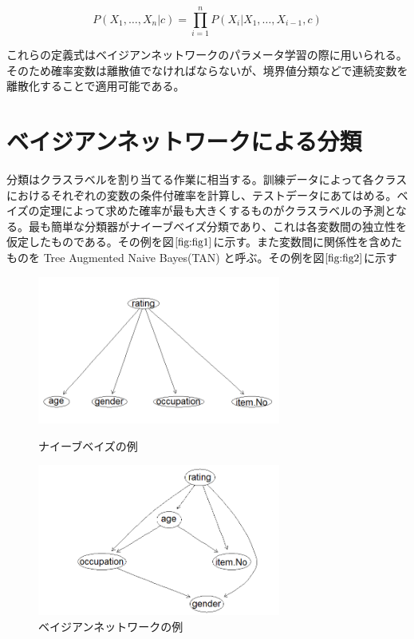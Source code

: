 \documentclass[a4j,12pt]{jarticle}
\begin{document}
\begin{equation}
\label{eq:eq2}
P(X_1, \ldots, X_n|c) = \prod_{i=1}^n P(X_i|X_1, \ldots, X_{i-1},c)
\end{equation}

これらの定義式はベイジアンネットワークのパラメータ学習の際に用いられる。そのため確率変数は離散値でなければならないが、境界値分類などで連続変数を離散化することで適用可能である。

\section{ベイジアンネットワークによる分類}

分類はクラスラベルを割り当てる作業に相当する。訓練データによって各クラスにおけるそれぞれの変数の条件付確率を計算し、テストデータにあてはめる。ベイズの定理によって求めた確率が最も大きくするものがクラスラベルの予測となる。最も簡単な分類器がナイーブベイズ分類であり、これは各変数間の独立性を仮定したものである。その例を図$\ref{fig:fig1}$に示す。また変数間に関係性を含めたものを Tree Augmented Naive Bayes(TAN) と呼ぶ。その例を図$\ref{fig:fig2}$に示す

\begin{figure}[H]
\begin{minipage}{0.5\hsize}
 \begin{center}
  \includegraphics[width=80mm]{data/sample1.png}
 \end{center}
 \caption{ナイーブベイズの例}
 \label{fig:fig1}
 \end{minipage}
\begin{minipage}{0.5\hsize}
 \begin{center}
  \includegraphics[width=80mm]{data/sample2.png}
 \end{center}
 \caption{ベイジアンネットワークの例}
 \label{fig:fig2}
 \end{minipage}
\end{figure}
\end{document}
